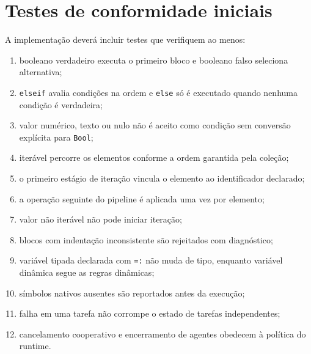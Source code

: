 \documentclass[12pt,a4paper]{article}
\begin{document}
\section{Testes de conformidade iniciais}
A implementação deverá incluir testes que verifiquem ao menos:
\begin{enumerate}
\item booleano verdadeiro executa o primeiro bloco e booleano falso seleciona alternativa;
\item \texttt{elseif} avalia condições na ordem e \texttt{else} só é executado quando nenhuma condição é verdadeira;
\item valor numérico, texto ou nulo não é aceito como condição sem conversão explícita para \texttt{Bool};
\item iterável percorre os elementos conforme a ordem garantida pela coleção;
\item o primeiro estágio de iteração vincula o elemento ao identificador declarado;
\item a operação seguinte do pipeline é aplicada uma vez por elemento;
\item valor não iterável não pode iniciar iteração;
\item blocos com indentação inconsistente são rejeitados com diagnóstico;
\item variável tipada declarada com \texttt{=:} não muda de tipo, enquanto variável dinâmica segue as regras dinâmicas;
\item símbolos nativos ausentes são reportados antes da execução;
\item falha em uma tarefa não corrompe o estado de tarefas independentes;
\item cancelamento cooperativo e encerramento de agentes obedecem à política do runtime.
\end{enumerate}
\end{document}
